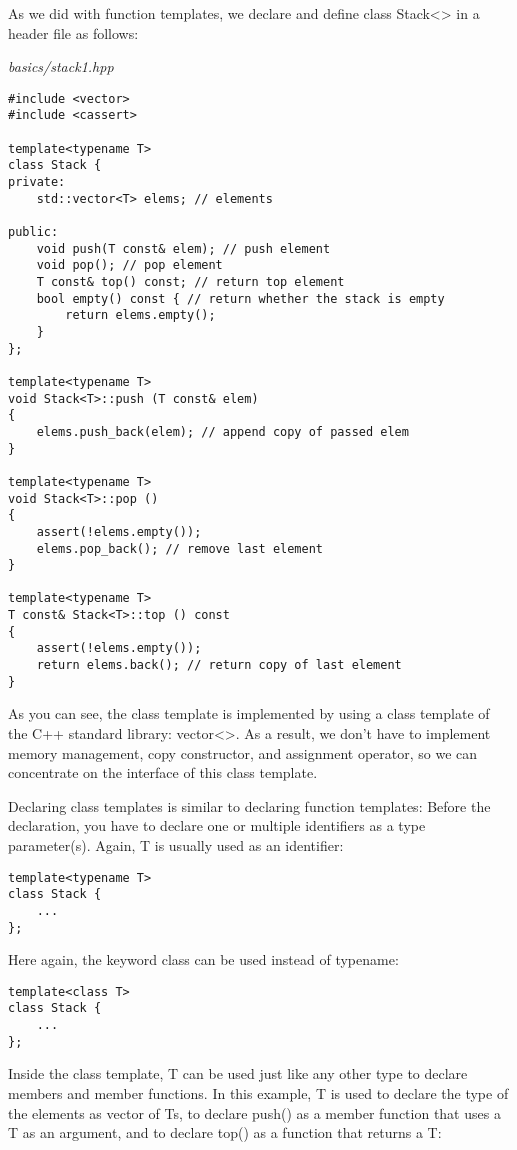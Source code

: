 
As we did with function templates, we declare and define class Stack<> in a header file as follows:

\noindent
\textit{basics/stack1.hpp}
\begin{lstlisting}[style=styleCXX]
#include <vector>
#include <cassert>

template<typename T>
class Stack {
private:
	std::vector<T> elems; // elements
	
public:
	void push(T const& elem); // push element
	void pop(); // pop element
	T const& top() const; // return top element
	bool empty() const { // return whether the stack is empty
		return elems.empty();
	}
};

template<typename T>
void Stack<T>::push (T const& elem)
{
	elems.push_back(elem); // append copy of passed elem
}

template<typename T>
void Stack<T>::pop ()
{
	assert(!elems.empty());
	elems.pop_back(); // remove last element
}

template<typename T>
T const& Stack<T>::top () const
{
	assert(!elems.empty());
	return elems.back(); // return copy of last element
}
\end{lstlisting}

As you can see, the class template is implemented by using a class template of the C++ standard library: vector<>. As a result, we don’t have to implement memory management, copy constructor, and assignment operator, so we can concentrate on the interface of this class template.


Declaring class templates is similar to declaring function templates: Before the declaration, you have to declare one or multiple identifiers as a type parameter(s). Again, T is usually used as an identifier:

\begin{lstlisting}[style=styleCXX]
template<typename T>
class Stack {
	...
};
\end{lstlisting}

Here again, the keyword class can be used instead of typename:

\begin{lstlisting}[style=styleCXX]
template<class T>
class Stack {
	...
};
\end{lstlisting}

Inside the class template, T can be used just like any other type to declare members and member functions. In this example, T is used to declare the type of the elements as vector of Ts, to declare push() as a member function that uses a T as an argument, and to declare top() as a function that returns a T:

